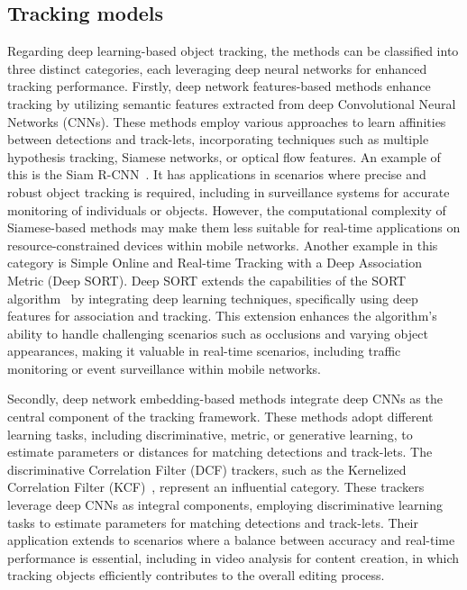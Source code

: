 \subsection{Tracking models}\label{subsec:track}

Regarding deep learning-based object tracking, the methods can be classified into three distinct categories, each leveraging deep neural networks for enhanced tracking performance.
Firstly, deep network features-based methods enhance tracking by utilizing semantic features extracted from deep Convolutional Neural Networks (CNNs).
These methods employ various approaches to learn affinities between detections and track-lets, incorporating techniques such as multiple hypothesis tracking, Siamese networks, or optical flow features.
An example of this is the Siam R-CNN~\cite{siam}.
It has applications in scenarios where precise and robust object tracking is required, including in surveillance systems for accurate monitoring of individuals or objects.
However, the computational complexity of Siamese-based methods may make them less suitable for real-time applications on resource-constrained devices within mobile networks.
Another example in this category is Simple Online and Real-time Tracking with a Deep Association Metric (Deep SORT)\cite{DeepSORT}.
Deep SORT extends the capabilities of the SORT algorithm~\cite{SORT} by integrating deep learning techniques, specifically using deep features for association and tracking.
This extension enhances the algorithm's ability to handle challenging scenarios such as occlusions and varying object appearances, making it valuable in real-time scenarios, including traffic monitoring or event surveillance within mobile networks.

Secondly, deep network embedding-based methods integrate deep CNNs as the central component of the tracking framework.
These methods adopt different learning tasks, including discriminative, metric, or generative learning, to estimate parameters or distances for matching detections and track-lets.
The discriminative Correlation Filter (DCF) trackers, such as the Kernelized Correlation Filter (KCF)~\cite{KCF}, represent an influential category.
These trackers leverage deep CNNs as integral components, employing discriminative learning tasks to estimate parameters for matching detections and track-lets.
Their application extends to scenarios where a balance between accuracy and real-time performance is essential, including in video analysis for content creation, in which tracking objects efficiently contributes to the overall editing process.

